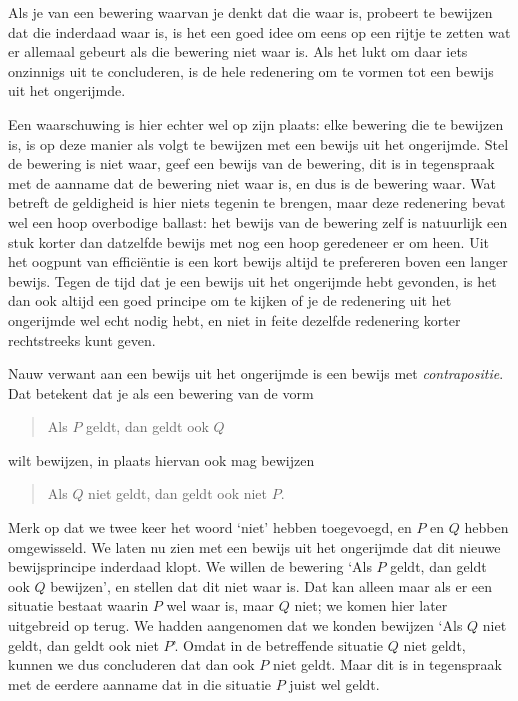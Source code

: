 Als je van een bewering waarvan je denkt dat die waar is, probeert te bewijzen dat die inderdaad waar is, is het een goed idee om eens op een rijtje te zetten wat er allemaal gebeurt als die bewering niet waar is. Als het lukt om daar iets onzinnigs uit te concluderen, is de hele redenering om te vormen tot een bewijs uit het ongerijmde. 

Een waarschuwing is hier echter wel op zijn plaats: elke bewering die te bewijzen is, is op deze manier als volgt te bewijzen met een bewijs uit het ongerijmde. Stel de bewering is niet waar, geef een bewijs van de bewering, dit is in tegenspraak met de aanname dat de bewering niet waar is, en dus is de bewering waar. Wat betreft de geldigheid is hier niets tegenin te brengen, maar deze redenering bevat wel een hoop overbodige ballast: het bewijs van de bewering zelf is natuurlijk een stuk korter dan datzelfde bewijs met nog een hoop geredeneer er om heen. Uit het oogpunt van effici\"entie is een kort bewijs altijd te prefereren boven een langer bewijs. Tegen de tijd dat je een bewijs uit het ongerijmde hebt gevonden, is het dan ook altijd een goed principe om te kijken of je de redenering uit het ongerijmde wel echt nodig hebt, en niet in feite dezelfde redenering korter rechtstreeks kunt geven.

Nauw verwant aan een bewijs uit het ongerijmde is een bewijs met \textit{contrapositie}. Dat betekent dat je als een bewering van de vorm
\begin{quote}
Als $P$ geldt, dan geldt ook $Q$
\end{quote}
wilt bewijzen, in plaats hiervan ook mag bewijzen 
\begin{quote}
Als $Q$ niet geldt, dan geldt ook niet $P$.
\end{quote}

Merk op dat we twee keer het woord `niet' hebben toegevoegd, en $P$ en $Q$ hebben omgewisseld. We laten nu zien met een bewijs uit het ongerijmde dat dit nieuwe bewijsprincipe inderdaad klopt. We willen de bewering `Als $P$ geldt, dan geldt ook $Q$ bewijzen', en stellen dat dit niet  waar is. Dat  kan  alleen maar als er een  situatie bestaat waarin $P$ wel waar is, maar $Q$ niet; we  komen hier  later  uitgebreid  op  terug.  We  hadden  aangenomen dat we konden bewijzen `Als $Q$ niet geldt, dan geldt ook niet $P$'. Omdat in de  betreffende situatie $Q$ niet geldt, kunnen we dus concluderen dat dan ook $P$  niet geldt. Maar dit is in tegenspraak met de eerdere aanname dat in die situatie $P$ juist wel geldt.

